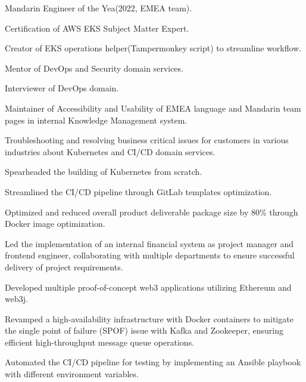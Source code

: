 \documentclass[]{deedy-resume-openfont}
\begin{document}
\begin{minipage}[t]{1\textwidth}
\null\hfill{}
\begin{tightemize}
    \item Mandarin Engineer of the Yea(2022, EMEA team).
    \item Certiﬁcation of AWS EKS Subject Matter Expert.
    \item Creator of EKS operations helper(Tampermonkey script) to streamline workﬂow.
    \item Mentor of DevOps and Security domain services.
    \item Interviewer of DevOps domain.
    \item Maintainer of Accessibility and Usability of EMEA language and Mandarin team pages in internal Knowledge Management system.
    \item Troubleshooting and resolving business critical issues for customers in various industries about Kubernetes and CI/CD domain services.
\end{tightemize}
\sectionsep

\null\hfill{}
\begin{tightemize}
    \item Spearheaded the building of Kubernetes from scratch.
    \item Streamlined the CI/CD pipeline through GitLab templates optimization.
    \item Optimized and reduced overall product deliverable package size by 80\% through Docker image optimization.
    \item Led the implementation of an internal financial system as project manager and frontend engineer, collaborating with multiple departments to ensure successful delivery of project requirements.
\end{tightemize}
\sectionsep

\null\hfill{}
\begin{tightemize}
    \item Developed multiple proof-of-concept web3 applications utilizing Ethereum and web3j.
\end{tightemize}
\sectionsep

\null\hfill{}
\begin{tightemize}
    \item Revamped a high-availability infrastructure with Docker containers to mitigate the single point of failure (SPOF) issue with Kafka and Zookeeper, ensuring efficient high-throughput message queue operations.
    \item Automated the CI/CD pipeline for testing by implementing an Ansible playbook with different environment variables.
\end{tightemize}
\sectionsep


\end{minipage}
\end{document}
